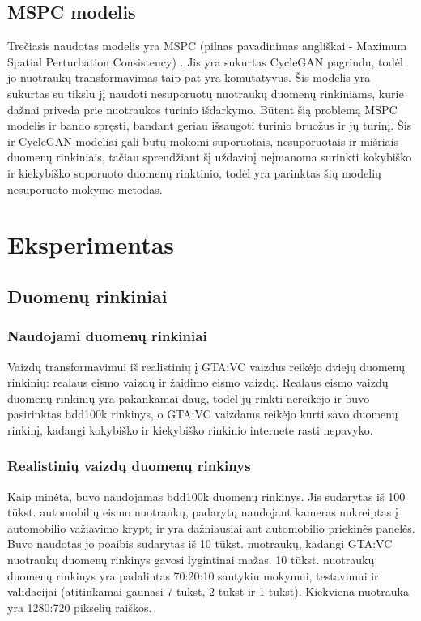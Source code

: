 \documentclass{VUMIFPSkursinis}
\begin{document}
    \subsection{MSPC modelis}
        Trečiasis naudotas modelis yra MSPC (pilnas pavadinimas angliškai - Maximum Spatial Perturbation Consistency) \cite{Mspc}. Jis yra sukurtas CycleGAN \cite{CycleGAN2017} pagrindu, todėl jo nuotraukų transformavimas taip pat yra komutatyvus. Šis modelis yra sukurtas su tikslu jį naudoti nesuporuotų nuotraukų duomenų rinkiniams, kurie dažnai priveda prie nuotraukos turinio išdarkymo. Būtent šią problemą MSPC modelis ir bando spręsti, bandant geriau išsaugoti turinio bruožus ir jų turinį. Šis ir CycleGAN modeliai gali būtų mokomi suporuotais, nesuporuotais ir mišriais duomenų rinkiniais, tačiau sprendžiant šį uždavinį neįmanoma surinkti kokybiško ir kiekybiško suporuoto duomenų rinktinio, todėl yra parinktas šių modelių nesuporuoto mokymo metodas.
\section{Eksperimentas}
    \subsection{Duomenų rinkiniai}
        \subsubsection{Naudojami duomenų rinkiniai}
            Vaizdų transformavimui iš realistinių į GTA:VC vaizdus reikėjo dviejų duomenų rinkinių: realaus eismo vaizdų ir žaidimo eismo vaizdų. Realaus eismo vaizdų duomenų rinkinių yra pakankamai daug, todėl jų rinkti nereikėjo ir buvo pasirinktas bdd100k rinkinys, o GTA:VC vaizdams reikėjo kurti savo duomenų rinkinį, kadangi kokybiško ir kiekybiško rinkinio internete rasti nepavyko. 
        \subsubsection{Realistinių vaizdų duomenų rinkinys}
            Kaip minėta, buvo naudojamas bdd100k duomenų rinkinys. Jis sudarytas iš 100 tūkst. automobilių eismo nuotraukų, padarytų naudojant kameras nukreiptas į automobilio važiavimo kryptį ir yra dažniausiai ant automobilio priekinės panelės. Buvo naudotas jo poaibis sudarytas iš 10 tūkst. nuotraukų, kadangi GTA:VC nuotraukų duomenų rinkinys gavosi lygintinai mažas. 10 tūkst. nuotraukų duomenų rinkinys yra padalintas 70:20:10 santykiu mokymui, testavimui ir validacijai (atitinkamai gaunasi 7 tūkst, 2 tūkst ir 1 tūkst). Kiekviena nuotrauka yra 1280:720 pikselių raiškos.
\end{document}
